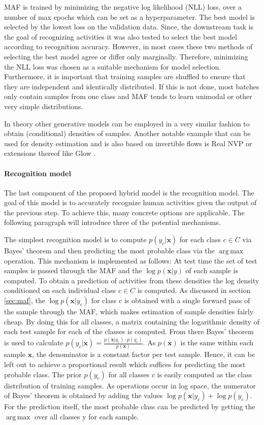 \documentclass[11pt,titlepage,oneside,openany]{book}
\DeclareMathOperator*{\argmax}{arg\,max}
\begin{document}
MAF is trained by minimizing the negative log likelihood (NLL) loss, over a number of max epochs which can be set as a hyperparameter. The best model is selected by the lowest loss on the validation data. Since, the downstream task is the goal of recognizing activities it was also tested to select the best model according to recognition accuracy. However, in most cases these two methods of selecting the best model agree or differ only marginally. Therefore, minimizing the NLL loss was chosen as a suitable mechanism for model selection. Furthermore, it is important that training samples are shuffled to ensure that they are independent and identically distributed. If this is not done, most batches only contain samples from one class and MAF tends to learn unimodal or other very simple distributions.

In theory other generative models can be employed in a very similar fashion to obtain (conditional) densities of samples. Another notable example that can be used for density estimation and is also based on invertible flows is Real NVP \cite{dinh_density_2017} or extensions thereof like Glow \cite{kingma_glow_2018}.

\paragraph{Recognition model}
The last component of the proposed hybrid model is the recognition model. The goal of this model is to accurately recognize human activities given the output of the previous step. To achieve this, many concrete options are applicable. The following paragraph will introduce three of the potential mechanisms.

The simplest recognition model is to compute $p(y_c|\pmb{x})$ for each class $c \in C$ via Bayes' theorem and then predicting the most probable class via the $\argmax$ operation. This mechanism is implemented as follows: At test time the set of test samples is passed through the MAF and the $\log p(\pmb{x}|y)$ of each sample is computed. To obtain a prediction of activities from these densities the log density conditioned on each individual class $c \in C$ is computed. As discussed in section \ref{sec:maf}, the $\log p(\pmb{x}|y_c)$ for class c is obtained with a single forward pass of the sample through the MAF, which makes estimation of sample densities fairly cheap. By doing this for all classes, a matrix containing the logarithmic density of each test sample for each of the classes is computed. From there Bayes' theorem is used to calculate $p(y_c|\pmb{x}) = \frac{p(\pmb{x}|y_c) \cdot p(y_c)}{p(\pmb{x})}$. As $p(\pmb{x})$ is the same within each sample $\pmb{x}$, the denominator is a constant factor per test sample. Hence, it can be left out to achieve a proportional result which suffices for predicting the most probable class. The prior $p(y_c)$ for all classes $c$ is easily computed as the class distribution of training samples. As operations occur in log space, the numerator of Bayes' theorem is obtained by adding the values $\log p(\pmb{x}|y_c) + \log p(y_c)$. For the prediction itself, the most probable class can be predicted by getting the $\argmax$ over all classes y for each sample.
\end{document}
